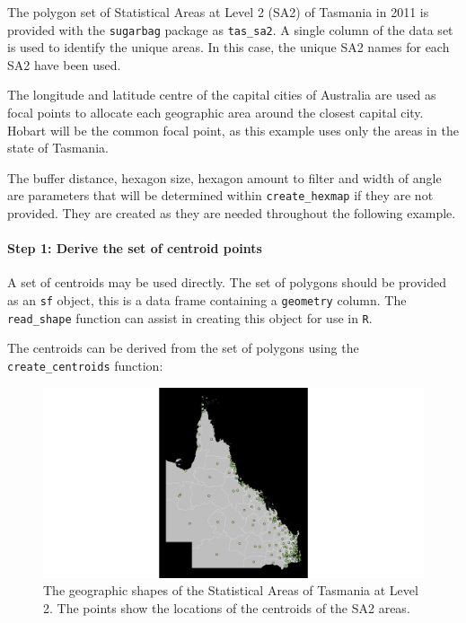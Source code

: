 The polygon set of Statistical Areas at Level 2 (SA2) \citep{abs2011} of
Tasmania in 2011 is provided with the \texttt{sugarbag} package as
\texttt{tas\_sa2}. A single column of the data set is used to identify
the unique areas. In this case, the unique SA2 names for each SA2 have
been used.

The longitude and latitude centre of the capital cities of Australia are
used as focal points to allocate each geographic area around the closest
capital city. Hobart will be the common focal point, as this example
uses only the areas in the state of Tasmania.

The buffer distance, hexagon size, hexagon amount to filter and width of
angle are parameters that will be determined within
\texttt{create\_hexmap} if they are not provided. They are created as
they are needed throughout the following example.

\hypertarget{step-1-derive-the-set-of-centroid-points}{%
\paragraph{Step 1: Derive the set of centroid
points}\label{step-1-derive-the-set-of-centroid-points}}

A set of centroids may be used directly. The set of polygons should be
provided as an \texttt{sf} object, this is a data frame containing a
\texttt{geometry} column. The \texttt{read\_shape} function can assist
in creating this object for use in \texttt{R}.

The centroids can be derived from the set of polygons using the
\texttt{create\_centroids} function:

\begin{figure}[h]
\centering
\includegraphics[width=14cm]{figs/1centroids.png}
\caption{\label{fig:centroids_plot}The geographic shapes of the Statistical Areas of Tasmania at Level 2. The points show the locations of the centroids of the SA2 areas.}
\end{figure}

